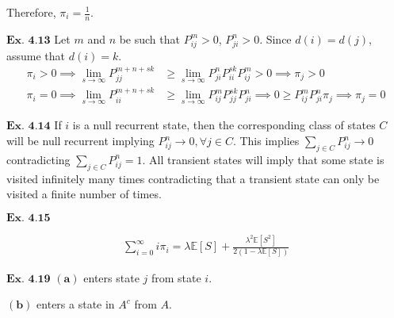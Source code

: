 \documentclass{article}
\begin{document}
Therefore, $\pi_i = \frac{1}{n}$.

\vspace{0.2in}
${\textbf{Ex. 4.13}}$
Let $m$ and $n$ be such that $P_{ij}^{m}>0$, $P_{ji}^{n}>0$. Since $d(i) = d(j)$, assume that $d(i) = k$.
\begin{align*}
\pi_{i}>0 \implies \lim_{s\rightarrow \infty}P_{jj}^{m+n+sk} &\geq \lim_{s\rightarrow \infty}P_{ji}^{n}P_{ii}^{sk}P_{ij}^{m} > 0 \implies \pi_{j}>0\\
\pi_{i}=0 \implies \lim_{s\rightarrow \infty}P_{ii}^{m+n+sk} &\geq \lim_{s\rightarrow \infty}P_{ij}^{m}P_{jj}^{sk}P_{ji}^{n} \implies 0 \geq P_{ij}^{m}P_{ji}^{n}\pi_{j} \implies \pi_j = 0
\end{align*}

\vspace{0.2in}
${\textbf{Ex. 4.14}}$
If $i$ is a null recurrent state, then the corresponding class of states $C$ will be null recurrent implying $P_{ij}^{n} \rightarrow 0, \forall j \in C$. This implies $\sum_{j\in C}P_{ij}^{n} \rightarrow 0$ contradicting $\sum_{j\in C}P_{ij}^{n} = 1$. All transient states will imply that some state is visited infinitely many times contradicting that a transient state can only be visited a finite number of times.

\vspace{0.2in}
${\textbf{Ex. 4.15}}$

\begin{align*}
\sum_{i=0}^{\infty}i\pi_i = \lambda \mathbb{E}[S] + \frac{\lambda^2\mathbb{E}[S^2]}{2(1-\lambda \mathbb{E}[S])}
\end{align*}

\vspace{0.2in}
\begin{comment}
${\textbf{Ex. 4.16}}$

\vspace{0.2in}
${\textbf{Ex. 4.17}}$

\vspace{0.2in}
${\textbf{Ex. 4.18}}$

\vspace{0.2in}
\end{comment}
${\textbf{Ex. 4.19}}$
$\mathbf{(a)}$
enters state $j$ from state $i$.

$\mathbf{(b)}$
enters a state in $A^{c}$ from $A$.
\end{document}
